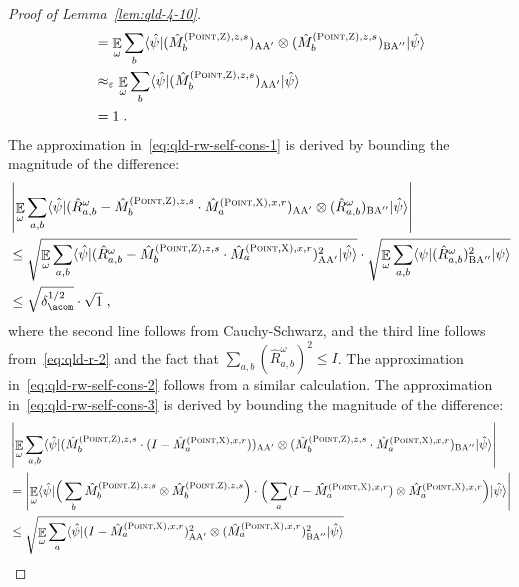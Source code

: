 \documentclass[11pt]{article}
\theoremstyle{definition}
\newcommand{\ket}[1]{|#1\rangle}
\newcommand{\bra}[1]{\langle#1|}
\newcommand{\Id}{\ensuremath{I}}
\newcommand{\eps}{\varepsilon}
\newcommand{\E}{\mathop{\mathbb{E}}\displaylimits}
\newcommand{\labelstyle}[1]{\ensuremath{\textsc{#1}}\xspace}
\newcommand{\xpt}{\labelstyle{X}}
\newcommand{\zpt}{\labelstyle{Z}}
\newcommand{\alice}{\labelstyle{A}}
\newcommand{\bob}{\labelstyle{B}}
\newcommand{\typestyle}[1]{\ensuremath{\textsc{#1}}\xspace}
\newcommand{\Point}{\typestyle{Point}}
\begin{document}
\begin{proof}[Proof of Lemma~\ref{lem:qld-4-10}]
\begin{align}
		&= \E_\omega \sum_{b} \bra{\hat{\psi}} (\hat{M}^{(\Point,\zpt),z,s}_{b})_{\alice \alice'} \otimes (\hat{M}^{(\Point,\zpt),z,s}_{b})_{\bob \alice''} \ket{\hat{\psi}} \notag \\
		&\approx_{\eps} \E_\omega \sum_{b} \bra{\hat{\psi}} (\hat{M}^{(\Point,\zpt),z,s}_{b})_{\alice \alice'} \ket{\hat{\psi}} \label{eq:qld-rw-self-cons-4} \\
		&= 1\;. \notag
	\end{align}
   	The approximation in~\eqref{eq:qld-rw-self-cons-1} is derived by bounding the magnitude of the difference:
	\begin{align*}
		&\left | \E_\omega \sum_{a,b} \bra{\hat{\psi}} (\hat{R}^\omega_{a,b} - \hat{M}^{(\Point,\zpt),z,s}_{b} \cdot \hat{M}^{(\Point,\xpt),x,r}_{a})_{\alice \alice'} \otimes (\hat{R}^\omega_{a,b})_{\bob \alice''} \ket{\hat{\psi}} \right | \\
		&\leq \sqrt{\E_\omega \sum_{a,b} \bra{\hat{\psi}} (\hat{R}^\omega_{a,b} - \hat{M}^{(\Point,\zpt),z,s}_{b} \cdot \hat{M}^{(\Point,\xpt),x,r}_{a})_{\alice \alice'}^2 \ket{\hat{\psi}} } \cdot \sqrt{\E_\omega \sum_{a,b} \bra{\psi} (\hat{R}^\omega_{a,b})^2_{\bob \alice''} \ket{\psi} } \\
		&\leq \sqrt{\delta_{\acom}^{1/2}} \cdot \sqrt{1}\;,
	\end{align*}
	where the second line follows from Cauchy-Schwarz, and the third line follows from~\eqref{eq:qld-r-2} and the fact that $\sum_{a,b} (\hat{R}^\omega_{a,b})^2 \leq \Id$. The approximation in~\eqref{eq:qld-rw-self-cons-2} follows from a similar calculation. 
	The approximation in~\eqref{eq:qld-rw-self-cons-3} is derived by bounding the magnitude of the difference:
	\begin{align}
		&\left | \E_\omega \sum_{a,b} \bra{\hat{\psi}} (\hat{M}^{(\Point,\zpt),z,s}_{b} \cdot (\Id - \hat{M}^{(\Point,\xpt),x,r}_{a}))_{\alice \alice'}  \otimes (\hat{M}^{(\Point,\zpt),z,s}_{b} \cdot \hat{M}^{(\Point,\xpt),x,r}_{a})_{\bob \alice''} \ket{\hat{\psi}} \right | \notag \\
		&= \left | \E_\omega  \bra{\hat{\psi}} \Big(\sum_b \hat{M}^{(\Point,\zpt),z,s}_{b} \otimes \hat{M}^{(\Point,\zpt),z,s}_{b}\Big) \cdot \Big(\sum_{a} (\Id - \hat{M}^{(\Point,\xpt),x,r}_{a}) \otimes \hat{M}^{(\Point,\xpt),x,r}_{a} \Big) \ket{\hat{\psi}} \right | \\
		&\leq \sqrt{\E_\omega \sum_{a} \bra{\hat{\psi}} (\Id - \hat{M}^{(\Point,\xpt),x,r}_{a})_{\alice \alice'}^2 \otimes (\hat{M}^{(\Point,\xpt),x,r}_{a})_{\bob \alice''}^2 \ket{\hat{\psi}}} \label{eq:qld-rw-self-cons-3-1}\\

\end{align}
\end{proof}
\end{document}

